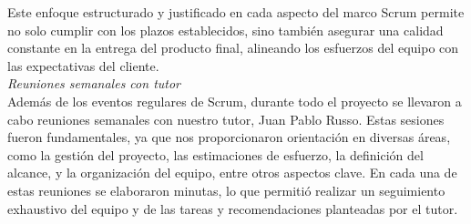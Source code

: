 Este enfoque estructurado y justificado en cada aspecto del marco Scrum permite no solo cumplir con los plazos establecidos, sino también asegurar una calidad constante en la entrega del producto 
final, alineando los esfuerzos del equipo con las expectativas del cliente.\\

\textit{Reuniones semanales con tutor}\\
Además de los eventos regulares de Scrum, durante todo el proyecto se llevaron a cabo reuniones semanales con nuestro tutor, Juan Pablo Russo. Estas sesiones fueron fundamentales, ya que nos 
proporcionaron orientación en diversas áreas, como la gestión del proyecto, las estimaciones de esfuerzo, la definición del alcance, y la organización del equipo, entre otros aspectos clave. 
En cada una de estas reuniones se elaboraron minutas, lo que permitió realizar un seguimiento exhaustivo del equipo y de las tareas y recomendaciones planteadas por el tutor.



